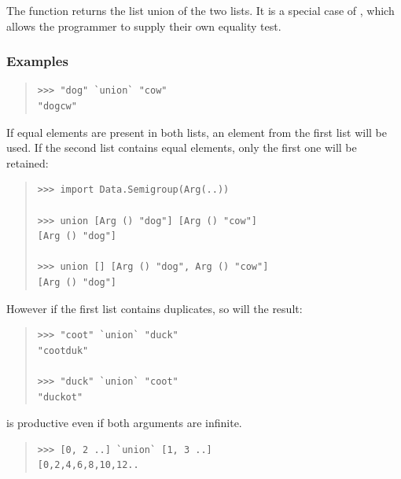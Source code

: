 \begin{haddockdesc}
\item[\begin{tabular}{@{}l}
union :: Eq a => {\char 91}a{\char 93} -> {\char 91}a{\char 93} -> {\char 91}a{\char 93}
\end{tabular}]
{\haddockbegindoc
The  function returns the list union of the two lists.
 It is a special case of , which allows the programmer to supply
 their own equality test.\par
\subsubsection*{\textbf{Examples}}
\begin{quote}
{\haddockverb\begin{verbatim}
>>> "dog" `union` "cow"
"dogcw"

\end{verbatim}}
\end{quote}
If equal elements are present in both lists, an element from the first list
 will be used. If the second list contains equal elements, only the first one
 will be retained:\par
\begin{quote}
{\haddockverb\begin{verbatim}
>>> import Data.Semigroup(Arg(..))

>>> union [Arg () "dog"] [Arg () "cow"]
[Arg () "dog"]

>>> union [] [Arg () "dog", Arg () "cow"]
[Arg () "dog"]

\end{verbatim}}
\end{quote}
However if the first list contains duplicates, so will
 the result:\par
\begin{quote}
{\haddockverb\begin{verbatim}
>>> "coot" `union` "duck"
"cootduk"

>>> "duck" `union` "coot"
"duckot"

\end{verbatim}}
\end{quote}
 is productive even if both arguments are infinite.\par
\begin{quote}
{\haddockverb\begin{verbatim}
>>> [0, 2 ..] `union` [1, 3 ..]
[0,2,4,6,8,10,12..

\end{verbatim}}
\end{quote}}
\end{haddockdesc}
